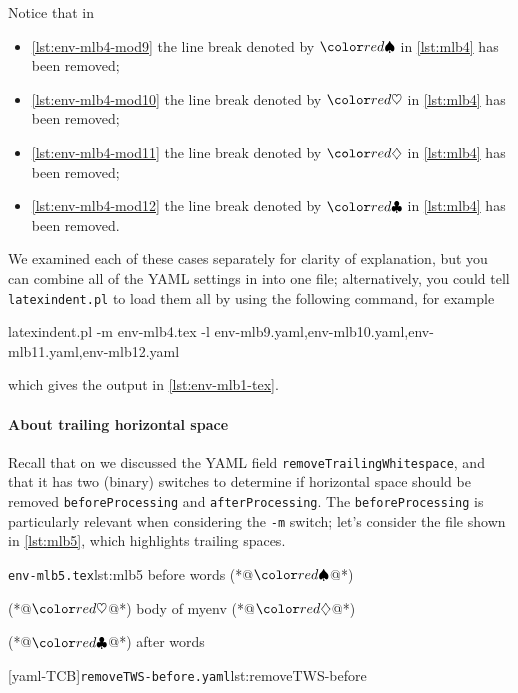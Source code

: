 	Notice that in
	\begin{itemize}
		\item \cref{lst:env-mlb4-mod9} the line break denoted by $\BeginStartsOnOwnLine$ in \cref{lst:mlb4} has been removed;
		\item \cref{lst:env-mlb4-mod10} the line break denoted by $\BodyStartsOnOwnLine$ in \cref{lst:mlb4} has been removed;
		\item \cref{lst:env-mlb4-mod11} the line break denoted by $\EndStartsOnOwnLine$ in \cref{lst:mlb4} has been removed;
		\item \cref{lst:env-mlb4-mod12} the line break denoted by $\EndFinishesWithLineBreak$ in \cref{lst:mlb4} has been removed.
	\end{itemize}
	We examined each of these cases separately for clarity of explanation, but you can combine all of the YAML
	settings in  into one file; alternatively, you could tell \texttt{latexindent.pl}
	to load them all by using the following command, for example
	\begin{widepage}
		\begin{commandshell}
latexindent.pl -m env-mlb4.tex -l env-mlb9.yaml,env-mlb10.yaml,env-mlb11.yaml,env-mlb12.yaml
\end{commandshell}
	\end{widepage}
	which gives the output in \vref{lst:env-mlb1-tex}.

	\paragraph{About trailing horizontal space}
		Recall that on  we discussed the YAML field \texttt{removeTrailingWhitespace},
		and that it has two (binary) switches to determine if horizontal space should be removed \texttt{beforeProcessing} and \texttt{afterProcessing}.
		The \texttt{beforeProcessing} is particularly relevant when considering the \texttt{-m} switch; let's consider the
		file shown in \cref{lst:mlb5}, which highlights trailing spaces.

		\begin{minipage}{.45\linewidth}
			\begin{cmhlistings}[showspaces=true,escapeinside={(*@}{@*)}]{\texttt{env-mlb5.tex}}{lst:mlb5}
before words   (*@$\BeginStartsOnOwnLine$@*) 
\begin{myenv}           (*@$\BodyStartsOnOwnLine$@*)
body of myenv      (*@$\EndStartsOnOwnLine$@*) 
\end{myenv}     (*@$\EndFinishesWithLineBreak$@*)
after words
\end{cmhlistings}
		\end{minipage}
		\hfill
		\begin{minipage}{.45\linewidth}
			[yaml-TCB]{\texttt{removeTWS-before.yaml}}{lst:removeTWS-before}
		\end{minipage}

